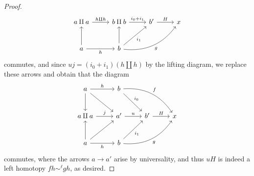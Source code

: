 \begin{proof}
\[\begin{tikzcd}[row sep = 2.5em, column sep = 2.5em]
	a\amalg a\ar[" h\amalg h ", r]  & b\amalg b \ar[" i_0+i_1 ", r]  & b' \ar[" H ", r]  & x \\
	a \ar[u] \ar[" h "', r]  & b \ar[u] \ar[" i_1 "', ur] \ar[" g "', bend right, urr]  &  & 
	\end{tikzcd}\]
	commutes, and since $uj=(i_0+i_1)(h\amalg h)$ by the lifting diagram, we replace these arrows and obtain that the diagram
	\[\begin{tikzcd}[row sep = 2.5em, column sep = 2.5em]
	a \ar[" h ", r] \ar[d] \ar[dr]  & b \ar[" i_0 ", dr] \ar[" f ", bend left, drr]  &  &  \\
	a\amalg a\ar[" j ", r]  & a' \ar[" u ", r]  & b' \ar[" H ", r]  & x \\
	a \ar[u] \ar[" h "', r] \ar[ur]  & b \ar[" i_1 "', ur] \ar[" g "', bend right, urr]  &  & 
	\end{tikzcd}\]
	commutes, where the arrows $a\to a'$ arise by universality, and thus $uH$ is indeed a left homotopy $fh\sim ^\ell gh$, as desired.


\end{proof}
